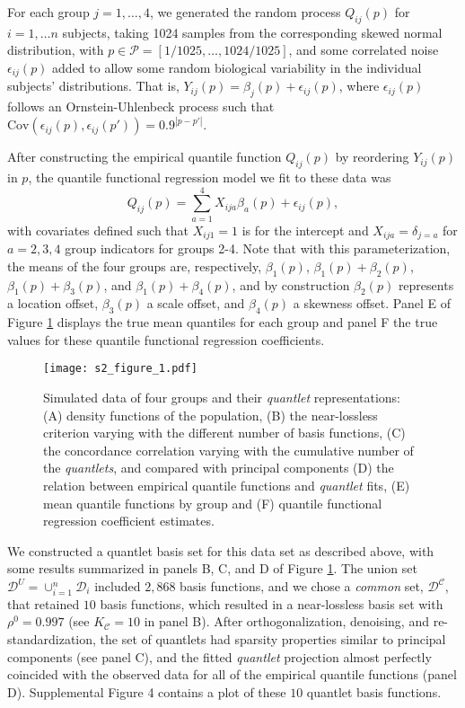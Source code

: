 \documentclass[11pt]{article}
\begin{document}
For each group $j=1,\ldots, 4$, we generated the random process $Q_{ij}(p)$ for $i=1,\ldots n$ subjects, taking 1024 samples from the corresponding skewed normal distribution, with $p\in \mathcal{P} = [1/1025, \ldots, 1024/1025]$, and some correlated
noise $\epsilon_{ij}(p)$ added to allow some random biological variability in the individual subjects' distributions.  That is, $Y_{ij}(p) = \beta_j(p)+\epsilon_{ij}(p)$,  where $\epsilon_{ij}(p)$ follows an Ornstein-Uhlenbeck process such that  $\text{Cov}(\epsilon_{ij}(p), \epsilon_{ij}(p') )=0.9^{|p-p'|}$.


After constructing the empirical quantile function $Q_{ij}(p)$ by reordering $Y_{ij}(p)$ in $p$, the quantile functional regression model we fit to these data was
 \begin{equation}
 Q_{ij}(p)= \sum_{a=1}^4 X_{ija} \beta_a(p) + \epsilon_{ij}(p),
  \label{mgroups} 
 \end{equation}
with covariates defined such that $X_{ij1}=1$ is for the intercept and $X_{ija}=\delta_{j=a}$ for $a=2, 3, 4$ group indicators for groups 2-4.  Note that with this parameterization, the means of the four groups are, respectively,
$\beta_1(p)$, $\beta_1(p)+\beta_2(p)$, $\beta_1(p)+\beta_3(p)$, and $\beta_1(p)+\beta_4(p)$, and by construction
$\beta_2(p)$ represents a location offset, $\beta_3(p)$ a scale offset, and $\beta_4(p)$ a skewness offset.  Panel E of Figure \ref{S2_Figure_1} displays the true mean quantiles for each group and panel F the true values for these quantile functional regression coefficients.


 \begin{figure}[!htb]
 \caption{ Simulated data of four groups and their {\it quantlet} representations:  (A) density functions of the population, (B) the near-lossless criterion varying with the different number of basis functions, (C) the concordance correlation varying with the cumulative number of the {\it quantlets}, and compared with principal components  (D) the relation between empirical quantile functions and {\it quantlet} fits, (E) mean quantile functions by group and (F) quantile functional regression coefficient estimates.
  \label{S2_Figure_1}}
\centering
\texttt{[image: s2\_figure\_1.pdf]}
\end{figure}

We constructed a quantlet basis set for this data set as described above, with some results summarized in panels B, C, and D of Figure \ref{S2_Figure_1}.  
The union set $\mathcal{D}^{U}= \cup_{i=1}^{n} \mathcal{D}_i$ included $2,868$ basis functions, and 
we chose a {\it common} set, $\mathcal{D}^{\mathcal{C}}$, that retained $10$ basis functions, which
resulted in a near-lossless basis set with $\rho^0=0.997$ (see $K_\mathcal{C}=10$ in  panel B).  After orthogonalization, denoising, and re-standardization, the
set of quantlets had sparsity properties similar to principal components (see panel C),
 and the fitted {\it quantlet} projection almost perfectly coincided with the observed data for all of the empirical quantile functions (panel D).  Supplemental Figure 4 contains a plot of these $10$ quantlet basis functions.
\end{document}
